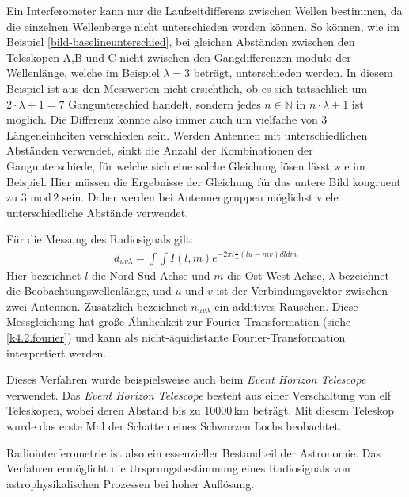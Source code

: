 Ein Interferometer kann nur die Laufzeitdifferenz zwischen Wellen bestimmen, da die einzelnen Wellenberge nicht unterschieden werden können. So können, wie im Beispiel  \cref{bild-baselineunterschied}, bei gleichen Abständen zwischen den Teleskopen A,B und C nicht zwischen den Gangdifferenzen modulo der Wellenlänge, welche im Beispiel $\lambda = 3$ beträgt, unterschieden werden. In diesem Beispiel ist aus den Messwerten nicht ersichtlich, ob es sich tatsächlich um $2\cdot \lambda +1 = 7$ Gangunterschied handelt, sondern jedes $n\in \mathbb{N}$ in $n\cdot\lambda+1$ ist möglich. Die Differenz könnte also immer auch um vielfache von 3 Längeneinheiten verschieden sein. Werden Antennen mit unterschiedlichen Abständen verwendet, sinkt die Anzahl der Kombinationen der Gangunterschiede, für welche sich eine solche Gleichung lösen lässt wie im Beispiel. Hier müssen die Ergebnisse der Gleichung für das untere Bild kongruent zu 3 $\mathrm{mod}\,2$ sein. Daher werden bei Antennengruppen möglichst viele unterschiedliche Abstände verwendet.

Für die Messung des Radiosignals gilt:
\begin{eqnarray}
d_{uv\lambda} =\int\int I(l,m)e^{-2\pi i \frac{1}{\lambda}(lu-mv)dldm}
\end{eqnarray}
Hier bezeichnet $l$ die Nord-Süd-Achse und $m$ die Ost-West-Achse, $\lambda$ bezeichnet die Beobachtungswellenlänge, und $u$ und $v$ ist der Verbindungsvektor zwischen zwei Antennen. Zusätzlich bezeichnet $n_{uv\lambda}$ ein additives Rauschen. Diese Messgleichung hat große Ähnlichkeit zur Fourier-Transformation (siehe \cref{k4.2.fourier}) und kann als nicht-äquidistante Fourier-Transformation interpretiert werden.

Dieses Verfahren wurde beispielsweise auch beim \emph{Event Horizon Telescope} verwendet. Das \emph{Event Horizon Telescope} besteht aus einer Verschaltung von elf Teleskopen, wobei deren Abstand bis zu $10000\,\text{km}$ beträgt. Mit diesem Teleskop wurde das erste Mal der Schatten eines Schwarzen Lochs beobachtet.

Radiointerferometrie ist also ein essenzieller Bestandteil der Astronomie. Das Verfahren ermöglicht die Ursprungsbestimmung eines Radiosignals von astrophysikalischen Prozessen bei hoher Auflösung.